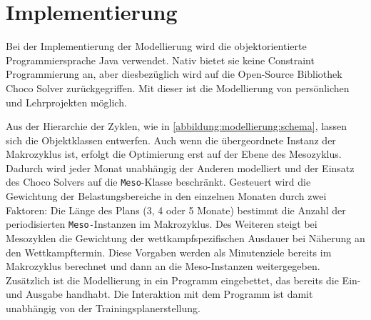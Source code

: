 \chapter{Implementierung}
\label{sec:implementierung} 
Bei der Implementierung der Modellierung wird die objektorientierte Programmiersprache Java \cite{java} verwendet. Nativ bietet sie keine Constraint Programmierung an, aber diesbezüglich wird auf die Open-Source Bibliothek Choco Solver \cite{ChocoSolverWeb} zurückgegriffen. Mit dieser ist die Modellierung von persönlichen und Lehrprojekten möglich. \par
Aus der Hierarchie der Zyklen, wie in \ref{abbildung:modellierung:schema}, lassen sich die Objektklassen entwerfen. Auch wenn die übergeordnete Instanz der Makrozyklus ist, erfolgt die Optimierung erst auf der Ebene des Mesozyklus. Dadurch wird jeder Monat unabhängig der Anderen modelliert und der Einsatz des Choco Solvers auf die \texttt{Meso}-Klasse beschränkt. Gesteuert wird die Gewichtung der Belastungsbereiche in den einzelnen Monaten durch zwei Faktoren: Die Länge des Plans (3, 4 oder 5 Monate) bestimmt die Anzahl der periodisierten \texttt{Meso-}Instanzen im Makrozyklus. Des Weiteren steigt bei Mesozyklen die Gewichtung der wettkampfspezifischen Ausdauer bei Näherung an den Wettkampftermin. Diese Vorgaben werden als Minutenziele bereits im Makrozyklus berechnet und dann an die Meso-Instanzen weitergegeben.
Zusätzlich ist die Modellierung in ein Programm eingebettet, das bereits die Ein- und Ausgabe handhabt. Die Interaktion mit dem Programm ist damit unabhängig von der Trainingsplanerstellung. \par

